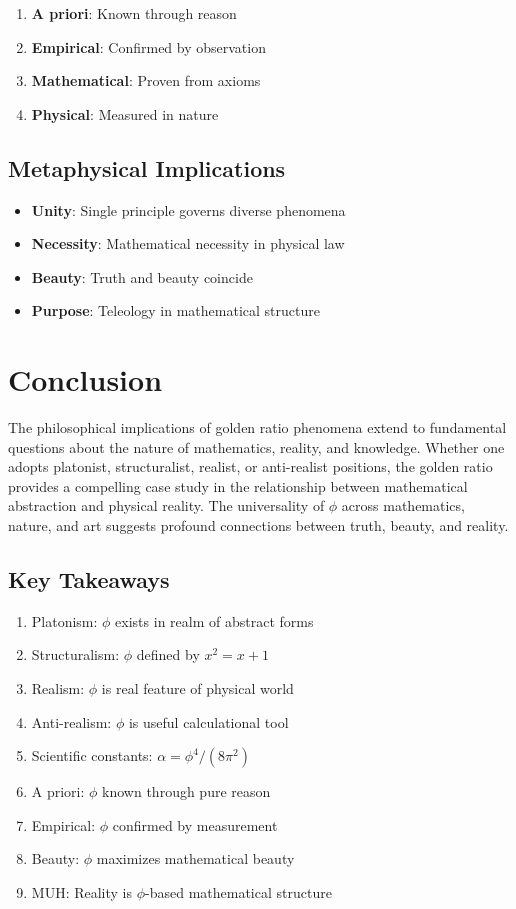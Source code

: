 \begin{enumerate}
    \item \textbf{A priori}: Known through reason
    \item \textbf{Empirical}: Confirmed by observation
    \item \textbf{Mathematical}: Proven from axioms
    \item \textbf{Physical}: Measured in nature
\end{enumerate}

\subsection{Metaphysical Implications}

\begin{itemize}
    \item \textbf{Unity}: Single principle governs diverse phenomena
    \item \textbf{Necessity}: Mathematical necessity in physical law
    \item \textbf{Beauty}: Truth and beauty coincide
    \item \textbf{Purpose}: Teleology in mathematical structure
\end{itemize}

\section{Conclusion}

The philosophical implications of golden ratio phenomena extend to fundamental questions about the nature of mathematics, reality, and knowledge. Whether one adopts platonist, structuralist, realist, or anti-realist positions, the golden ratio provides a compelling case study in the relationship between mathematical abstraction and physical reality. The universality of $\phi$ across mathematics, nature, and art suggests profound connections between truth, beauty, and reality.

\subsection*{Key Takeaways}

\begin{enumerate}
    \item Platonism: $\phi$ exists in realm of abstract forms
    \item Structuralism: $\phi$ defined by $x^2 = x + 1$
    \item Realism: $\phi$ is real feature of physical world
    \item Anti-realism: $\phi$ is useful calculational tool
    \item Scientific constants: $\alpha = \phi^4/(8\pi^2)$
    \item A priori: $\phi$ known through pure reason
    \item Empirical: $\phi$ confirmed by measurement
    \item Beauty: $\phi$ maximizes mathematical beauty
    \item MUH: Reality is $\phi$-based mathematical structure
\end{enumerate}


